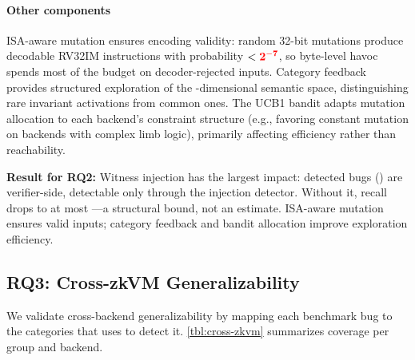 \paragraph{Other components}
ISA-aware mutation ensures encoding validity: random 32-bit mutations produce decodable RV32IM instructions with probability $< {{\color{red}{{{\bf 2^{-7}}}}}}$, so byte-level havoc spends most of the budget on decoder-rejected inputs. Category feedback provides structured exploration of the -dimensional semantic space, distinguishing rare invariant activations from common ones. The UCB1 bandit adapts mutation allocation to each backend's constraint structure (e.g., favoring constant mutation on backends with complex limb logic), primarily affecting efficiency rather than reachability.

\begin{mdframed}[
    backgroundcolor=gray!10,
    linecolor=white,
    skipabove=0.5em
    ]\noindent
    \textbf{Result for RQ2:} Witness injection has the largest impact:  detected bugs () are verifier-side, detectable only through the injection detector. Without it, recall drops to at most ---a structural bound, not an estimate. ISA-aware mutation ensures valid inputs; category feedback and bandit allocation improve exploration efficiency.
\end{mdframed}

\subsection{RQ3: Cross-zkVM Generalizability}\label{sec:eval-rq3}

We validate cross-backend generalizability by mapping each benchmark bug to the categories that \tool uses to detect it. \autoref{tbl:cross-zkvm} summarizes coverage per group and backend.

